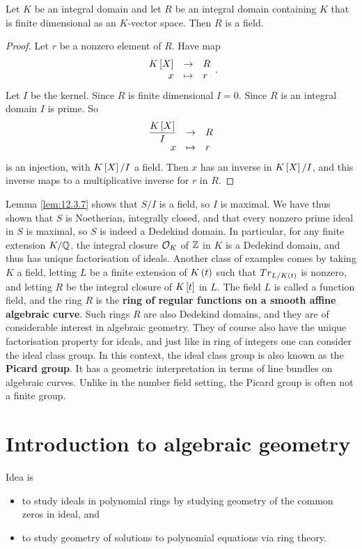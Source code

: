 \begin{lemma}
\label{lem:12.3.7}
Let $ K $ be an integral domain and let $ R $ be an integral domain containing $ K $ that is finite dimensional as an $ K $-vector space. Then $ R $ is a field.
\end{lemma}

\begin{proof}
Let $ r $ be a nonzero element of $ R $. Have map
$$ \function{K\sb{X}}{R}{x}{r}. $$
Let $ I $ be the kernel. Since $ R $ is finite dimensional $ I = 0 $. Since $ R $ is an integral domain $ I $ is prime. So
$$ \function{\dfrac{K\sb{X}}{I}}{R}{x}{r} $$
is an injection, with $ K\sb{X} / I $ a field. Then $ x $ has an inverse in $ K\sb{X} / I $, and this inverse maps to a multiplicative inverse for $ r $ in $ R $.
\end{proof}

Lemma \ref{lem:12.3.7} shows that $ S / I $ is a field, so $ I $ is maximal. We have thus shown that $ S $ is Noetherian, integrally closed, and that every nonzero prime ideal in $ S $ is maximal, so $ S $ is indeed a Dedekind domain. In particular, for any finite extension $ K / \Q $, the integral closure $ \OO_K $ of $ \Z $ in $ K $ is a Dedekind domain, and thus has unique factorisation of ideals. Another class of examples comes by taking $ K $ a field, letting $ L $ be a finite extension of $ K\rb{t} $ such that $ Tr_{L / K\rb{t}} $ is nonzero, and letting $ R $ be the integral closure of $ K\sb{t} $ in $ L $. The field $ L $ is called a function field, and the ring $ R $ is the \textbf{ring of regular functions on a smooth affine algebraic curve}. Such rings $ R $ are also Dedekind domains, and they are of considerable interest in algebraic geometry. They of course also have the unique factorisation property for ideals, and just like in ring of integers one can consider the ideal class group. In this context, the ideal class group is also known as the \textbf{Picard group}. It has a geometric interpretation in terms of line bundles on algebraic curves. Unlike in the number field setting, the Picard group is often not a finite group.

\pagebreak

\section{Introduction to algebraic geometry}


Idea is
\begin{itemize}
\item to study ideals in polynomial rings by studying geometry of the common zeros in ideal, and
\item to study geometry of solutions to polynomial equations via ring theory.
\end{itemize}

